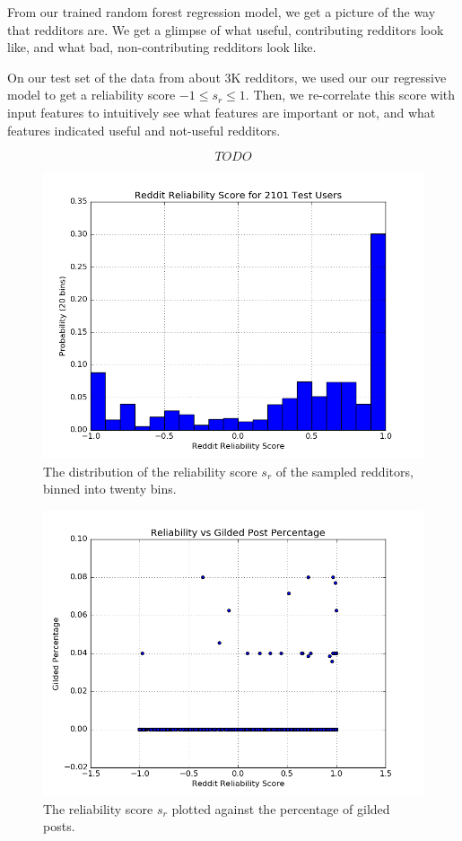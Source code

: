 From our trained random forest regression model, we get a picture of the way
that redditors are. We get a glimpse of what useful, contributing redditors look
like, and what bad, non-contributing redditors look like.

On our test set of the data from about 3K redditors, we used our our regressive
model to get a reliability score $-1 \leq s_r \leq 1$. Then, we re-correlate
this score with input features to intuitively see what features are important or
not, and what features indicated useful and not-useful redditors.

\[ TODO \]

\begin{figure}[tb]
    \centering
    \includegraphics[width=\linewidth]{figures/data_20.png}
    \caption{The distribution of the reliability score $s_r$ of the sampled redditors, binned into twenty bins.}
    \label{fig:data_20}
\end{figure}

\begin{figure}[tb]
    \centering
    \includegraphics[width=\linewidth]{figures/reliability_gilded.png}
    \caption{The reliability score $s_r$ plotted against the percentage of gilded posts.}
    \label{fig:reliability_gilded}
\end{figure}

